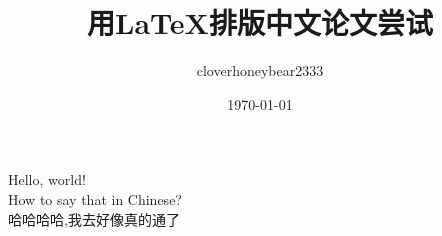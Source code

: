 \documentclass{article}
\title{用\LaTeX 排版中文论文尝试}
\author{cloverhoneybear2333}
\date{\today}
\begin{document}
\maketitle
Hello, world!\\
How to say that in Chinese?\\
哈哈哈哈,我去好像真的通了
\end{document}
